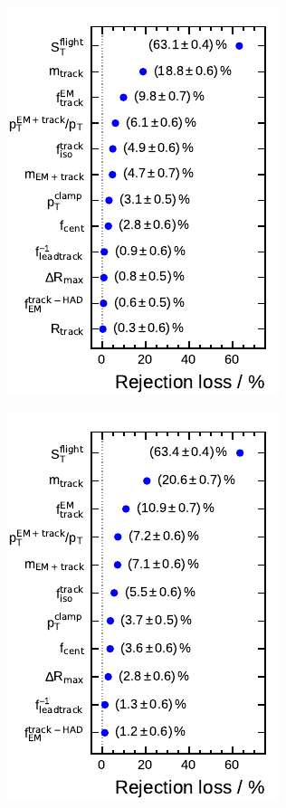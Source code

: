 \noindent
\begin{minipage}{\textwidth}
  \captionsetup{type=figure}
  \centering
  \begin{subfigure}[t]{0.32\textwidth}
    \centering
    \includegraphics{./figures/bdt_perf/var_importance/3p_iter1.pdf}
  \end{subfigure}
  \begin{subfigure}[t]{0.32\textwidth}
    \centering
    \includegraphics{./figures/bdt_perf/var_importance/3p_iter2.pdf}

\end{subfigure}
\end{minipage}
